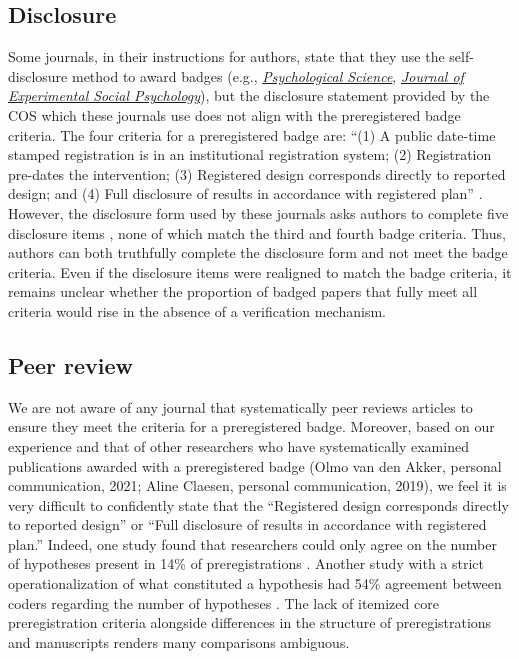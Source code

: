 \documentclass[authordate, meta, issue]{jote-new-article}
\begin{document}
\subsection{Disclosure}

Some journals, in their instructions for authors, state that they use the self-disclosure method to award badges (e.g., \href{https://www.psychologicalscience.org/publications/psychological_science/ps-submissions}{\emph{Psychological Science}}, \href{https://www.elsevier.com/journals/journal-of-experimental-social-psychology/0022-1031/guide-for-authors}{\emph{Journal of Experimental Social Psychology}}), but the disclosure statement provided by the COS which these journals use does not align with the preregistered badge criteria. The four criteria for a preregistered badge are: “(1) A public date-time stamped registration is in an institutional registration system; (2) Registration pre-dates the intervention; (3) Registered design corresponds directly to reported design; and (4) Full disclosure of results in accordance with registered plan” \parencites{COS2023}. However, the disclosure form used by these journals asks authors to complete five disclosure items \parencites{COS2016}, none of which match the third and fourth badge criteria. Thus, authors can both truthfully complete the disclosure form and not meet the badge criteria. Even if the disclosure items were realigned to match the badge criteria, it remains unclear whether the proportion of badged papers that fully meet all criteria would rise in the absence of a verification mechanism.







\subsection{Peer review}

We are not aware of any journal that systematically peer reviews articles to ensure they meet the criteria for a preregistered badge. Moreover, based on our experience \parencites{TARG2022} and that of other researchers who have systematically examined publications awarded with a preregistered badge (Olmo van den Akker, personal communication, 2021; Aline Claesen, personal communication, 2019), we feel it is very difficult to confidently state that the “Registered design corresponds directly to reported design” or “Full disclosure of results in accordance with registered plan.” Indeed, one study found that researchers could only agree on the number of hypotheses present in 14\% of preregistrations \parencites{Bakker2020}. Another study with a strict operationalization of what constituted a hypothesis had 54\% agreement between coders regarding the number of hypotheses \parencites{vandenAkker2022}. The lack of itemized core preregistration criteria alongside differences in the structure of preregistrations and manuscripts renders many comparisons ambiguous.
\end{document}
